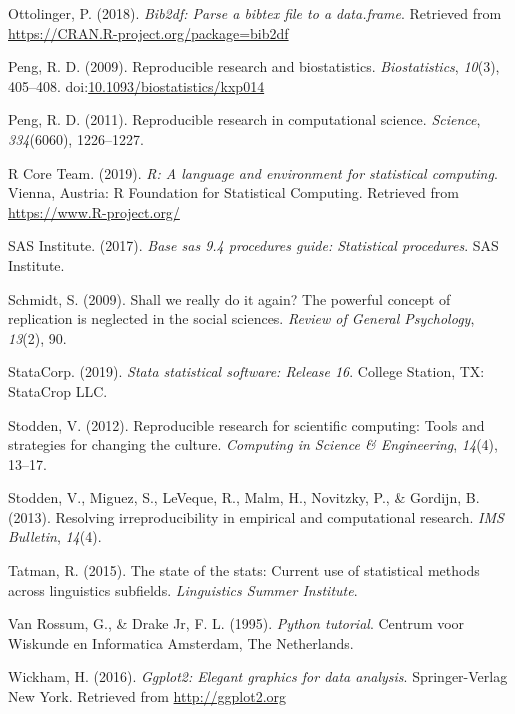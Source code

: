 \documentclass[
  english,
  ,man]{apa6}
\newlength{\cslhangindent}
\newenvironment{cslreferences}%
  {\setlength{\parindent}{0pt}%
  \everypar{\setlength{\hangindent}{\cslhangindent}}\ignorespaces}%
  {\par}
\begin{document}
\begin{cslreferences}
\leavevmode\hypertarget{ref-bib2df}{}%
Ottolinger, P. (2018). \emph{Bib2df: Parse a bibtex file to a data.frame}. Retrieved from \url{https://CRAN.R-project.org/package=bib2df}

\leavevmode\hypertarget{ref-peng2009}{}%
Peng, R. D. (2009). Reproducible research and biostatistics. \emph{Biostatistics}, \emph{10}(3), 405--408. doi:\href{https://doi.org/10.1093/biostatistics/kxp014}{10.1093/biostatistics/kxp014}

\leavevmode\hypertarget{ref-peng2011}{}%
Peng, R. D. (2011). Reproducible research in computational science. \emph{Science}, \emph{334}(6060), 1226--1227.

\leavevmode\hypertarget{ref-rpro}{}%
R Core Team. (2019). \emph{R: A language and environment for statistical computing}. Vienna, Austria: R Foundation for Statistical Computing. Retrieved from \url{https://www.R-project.org/}

\leavevmode\hypertarget{ref-sas2017base}{}%
SAS Institute. (2017). \emph{Base sas 9.4 procedures guide: Statistical procedures}. SAS Institute.

\leavevmode\hypertarget{ref-schmidt2009}{}%
Schmidt, S. (2009). Shall we really do it again? The powerful concept of replication is neglected in the social sciences. \emph{Review of General Psychology}, \emph{13}(2), 90.

\leavevmode\hypertarget{ref-stata}{}%
StataCorp. (2019). \emph{Stata statistical software: Release 16}. College Station, TX: StataCrop LLC.

\leavevmode\hypertarget{ref-stodden2012}{}%
Stodden, V. (2012). Reproducible research for scientific computing: Tools and strategies for changing the culture. \emph{Computing in Science \& Engineering}, \emph{14}(4), 13--17.

\leavevmode\hypertarget{ref-stodden2013}{}%
Stodden, V., Miguez, S., LeVeque, R., Malm, H., Novitzky, P., \& Gordijn, B. (2013). Resolving irreproducibility in empirical and computational research. \emph{IMS Bulletin}, \emph{14}(4).

\leavevmode\hypertarget{ref-tatman2015}{}%
Tatman, R. (2015). The state of the stats: Current use of statistical methods across linguistics subfields. \emph{Linguistics Summer Institute}.

\leavevmode\hypertarget{ref-van1995python}{}%
Van Rossum, G., \& Drake Jr, F. L. (1995). \emph{Python tutorial}. Centrum voor Wiskunde en Informatica Amsterdam, The Netherlands.

\leavevmode\hypertarget{ref-ggplot2}{}%
Wickham, H. (2016). \emph{Ggplot2: Elegant graphics for data analysis}. Springer-Verlag New York. Retrieved from \url{http://ggplot2.org}


\end{cslreferences}
\end{document}

